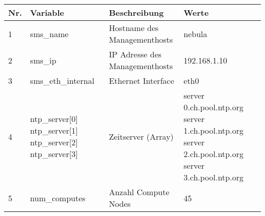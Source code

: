 \begin{longtable}{| p{0.5cm} | p{3cm} | p{8.5cm} | p{4cm} |} 
\hline
\rowcolor{heading} \textbf{Nr.} & \textbf{Variable} & \textbf{Beschreibung} &\textbf{Werte} \\\hline
1 & sms\_name & Hostname des Managementhosts & nebula \\\hline
2 & sms\_ip & IP Adresse des Managementhosts & 192.168.1.10 \\\hline
3 & sms\_eth\_internal & Ethernet Interface & eth0 \\\hline
4 & ntp\_server[0] \newline ntp\_server[1] \newline ntp\_server[2] \newline ntp\_server[3] & Zeitserver (Array) & server 0.ch.pool.ntp.org \newline server 1.ch.pool.ntp.org \newline server 2.ch.pool.ntp.org \newline server 3.ch.pool.ntp.org  \\\hline
5 & num\_computes & Anzahl Compute Nodes & 45 \\\hline

\end{longtable}
